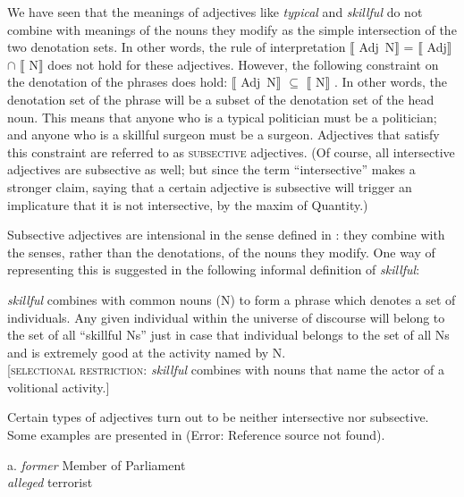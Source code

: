 We have seen that the meanings of adjectives like \textit{typical} and \textit{skillful} do not combine with meanings of the nouns they modify as the simple intersection of the two denotation sets. In other words, the rule of interpretation $\llbracket$ Adj~N$\rrbracket$  = $\llbracket$ Adj$\rrbracket$  ${\cap}$ $\llbracket$ N$\rrbracket$  does not hold for these adjectives. However, the following constraint on the denotation of the phrases does hold: $\llbracket$ Adj~N$\rrbracket$  ${\subseteq}$ $\llbracket$ N$\rrbracket$ . In other words, the denotation set of the phrase will be a subset of the denotation set of the head noun. This means that anyone who is a typical politician must be a politician; and anyone who is a skillful surgeon must be a surgeon. Adjectives that satisfy this constraint are referred to as \textsc{subsective} adjectives. (Of course, all intersective adjectives are subsective as well; but since the term “intersective” makes a stronger claim, saying that a certain adjective is subsective will trigger an implicature that it is not intersective, by the maxim of Quantity.)



Subsective adjectives are intensional in the sense defined in : they combine with the senses, rather than the denotations, of the nouns they modify. One way of representing this is suggested in the following informal definition of \textit{skillful}:


\ea






  \textit{skillful} combines with common nouns (N) to form a phrase which denotes a set of individuals. Any given individual within the universe of discourse will belong to the set of all “skillful Ns” just in case that individual belongs to the set of all Ns and is extremely good at the activity named by N.\\
{}[\textsc{selectional restriction}: \textit{skillful} combines with nouns that name the actor of a volitional activity.]
\z


Certain types of adjectives turn out to be neither intersective nor subsective. Some examples are presented in (Error: Reference source not found).


\ea






  a. \textit{former} Member of Parliament\\
\ex \textit{alleged} terrorist
\z



